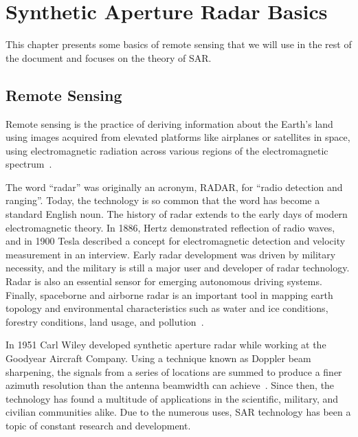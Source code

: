 \chapter{Synthetic Aperture Radar Basics}\label{chp:background}%
% 

%	




This chapter presents some basics of remote sensing that we will use in the rest of the document and focuses on the theory of SAR.


\section{Remote Sensing} \label{sec:pr_obs}

Remote sensing is the practice of deriving information about the Earth's land using images acquired from elevated platforms like airplanes or satellites in space, using electromagnetic radiation across various regions of the electromagnetic spectrum~\citep{campbell2011introduction}.

The word “radar” was originally an acronym, RADAR, for “radio detection and ranging”.
Today, the technology is so common that the word has become a standard English noun.
The history of radar extends to the early days of modern electromagnetic theory. 
In 1886, Hertz demonstrated reflection of radio waves, and in 1900 Tesla described a concept for electromagnetic detection and velocity measurement in an interview.
Early radar development was driven by military necessity, and the military is still a major user and developer of radar technology.
Radar is also an essential sensor for emerging autonomous driving systems. 
Finally, spaceborne and airborne radar is an important tool in mapping earth topology and environmental characteristics such as water and ice conditions, forestry conditions, land usage, and pollution~\citep{richards2005fundamentals}.

In 1951 Carl Wiley developed synthetic aperture radar while working at the Goodyear Aircraft Company. 
Using a technique known as Doppler beam sharpening, the signals from a series of locations are summed to produce a finer azimuth resolution than 
the antenna beamwidth can achieve~\citep{wiley1985synthetic}. 
Since then, the technology has found a multitude of applications in the scientific, military, and civilian communities alike. Due to the numerous uses, SAR technology has been a topic of constant
research and development.


